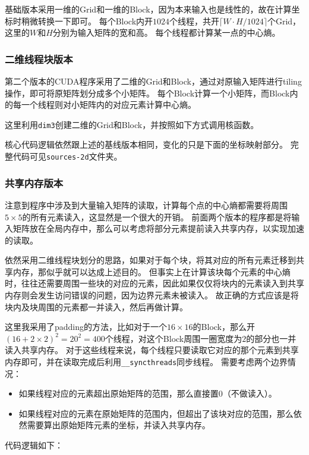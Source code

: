 \documentclass[logo,reportComp]{thesis}
\begin{document}
基础版本采用一维的Grid和一维的Block，因为本来输入也是线性的，故在计算坐标时稍微转换一下即可。
每个Block内开$1024$个线程，共开$\lceil W\cdot H/1024\rceil$个Grid，这里的$W$和$H$分别为输入矩阵的宽和高。
每个线程都计算某一点的中心熵。


\subsubsection{二维线程块版本}
第二个版本的CUDA程序采用了二维的Grid和Block，通过对原输入矩阵进行tiling操作，即可将原矩阵划分成多个小矩阵。
每个Block计算一个小矩阵，而Block内的每一个线程则对小矩阵内的对应元素计算中心熵。

这里利用\verb'dim3'创建二维的Grid和Block，并按照如下方式调用核函数。


核心代码逻辑依然跟上述的基线版本相同，变化的只是下面的坐标映射部分。
完整代码可见\verb'sources-2d'文件夹。


\subsubsection{共享内存版本}
注意到程序中涉及到大量输入矩阵的读取，计算每个点的中心熵都需要将周围$5\times 5$的所有元素读入，这显然是一个很大的开销。
前面两个版本的程序都是将输入矩阵放在全局内存中，那么可以考虑将部分元素提前读入共享内存，以实现加速的读取。

依然采用二维线程块划分的思路，如果对于每个块，将其对应的所有元素迁移到共享内存，那似乎就可以达成上述目的。
但事实上在计算该块每个元素的中心熵时，往往还需要周围一些块的对应的元素，因此如果仅仅将块内的元素读入到共享内存则会发生访问错误的问题，因为边界元素未被读入。
故正确的方式应该是将块内及块周围的元素都一并读入，然后再做计算。

这里我采用了padding的方法，比如对于一个$16\times 16$的Block，那么开$(16+2\times 2)^2=20^2=400$个线程，对这个Block周围一圈宽度为$2$的部分也一并读入共享内存。
对于这些线程来说，每个线程只要读取它对应的那个元素到共享内存即可，并在读取完成后利用\verb'__syncthreads'同步线程。
需要考虑两个边界情况：
\begin{itemize}
	\item 如果线程对应的元素超出原始矩阵的范围，那么直接置$0$（不做读入）。
	\item 如果线程对应的元素在原始矩阵的范围内，但超出了该块对应的范围，那么依然需要算出原始矩阵元素的坐标，并读入共享内存。
\end{itemize}
代码逻辑如下：

\end{document}
